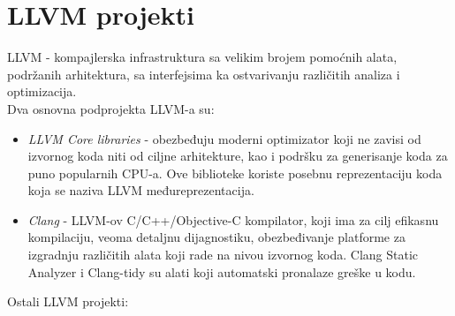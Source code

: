 \documentclass[10pt]{extarticle}
\begin{document}
\section{LLVM projekti}
\noindent
LLVM - kompajlerska infrastruktura sa velikim brojem pomoćnih alata, podržanih arhitektura, sa interfejsima ka ostvarivanju različitih analiza i optimizacija. \\
Dva osnovna podprojekta LLVM-a su:
\begin{itemize}
    \item \textit{LLVM Core libraries} - obezbeđuju moderni optimizator koji ne zavisi od izvornog koda niti od ciljne arhitekture, kao i podršku za generisanje koda za puno popularnih CPU-a. Ove biblioteke koriste posebnu reprezentaciju koda koja se naziva LLVM međureprezentacija.
    \item \textit{Clang} - LLVM-ov C/C++/Objective-C kompilator, koji ima za cilj efikasnu kompilaciju, veoma detaljnu dijagnostiku, obezbeđivanje platforme za izgradnju različitih alata koji rade na nivou izvornog koda. Clang Static Analyzer i Clang-tidy su alati koji automatski pronalaze greške u kodu.
\end{itemize}
Ostali LLVM projekti:
\end{document}
